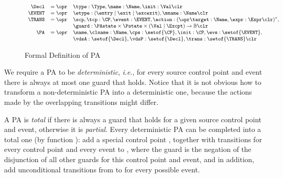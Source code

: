 
\begin{figure}[t]
\[{\small
\begin{array}{rcl}
\Decl & = \opr & \type : \Type, \name : \Name, \init : \Val
\clr \\
\EVENT & = \opr & \etype : (\entry \mid \exit \mid \excexit),
                 \mname : \Name \clr\\
\TRANS & = \opr & \scp, \tcp : \CP, \event : \EVENT, \action : (\opr \target : \Name, \expr : \Expr \clr)^*, \\
& &
\guard : \PAstate \times \Pstate \times (\Val \mid \Excpt) \rightarrow \mathbb{B}\clr\\
\PA & = \opr & \name, \clname : \Name, \cps : \setof{\CP},
            \init : \CP, \evs : \setof{\EVENT},\\
     &   &  \vdsA : \setof{\Decl}, \vdsP : \setof{\Decl},
            \trans : \setof{\TRANS} \clr
\end{array}}
\]
\caption{Formal Definition of PA}\label{FigPAForm}
\end{figure}

We require a PA to be \emph{deterministic}, \emph{i.e.}, for every
source control point and event there is always at most one guard that
holds. Notice that it is not obvious how to transform a
non-deterministic PA into a deterministic one, because the actions
made by the overlapping transitions might differ.

A PA is \emph{total} if there is always a guard that holds
for a given source control point and event, otherwise it is
\emph{partial}. Every deterministic PA can be completed into a total
one (by function \complete): add a special control point
\halted, together with transitions for every control point and every event
to \halted, where the guard is the negation of the
disjunction of all other guards for this control point and event, and
in addition, add unconditional transitions from \halted to \halted
for every possible event.

